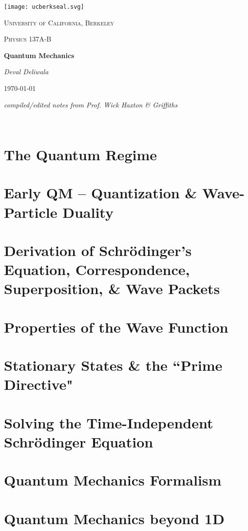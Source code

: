 \documentclass[10pt,letterpaper, twocolumn]{report}
\begin{document}
\begin{titlepage}
	\centering
	\texttt{[image: ucberkseal.svg]}\par\vspace{1cm}
	{\LARGE \textsc{University of California, Berkeley}\par}
	\vspace{1cm}
	{\Large \textsc{Physics 137A-B}\par}
	\vspace{1.5cm}
	{\huge\bfseries Quantum Mechanics \par}
	\vspace{2cm}
	{\Large\itshape Deval Deliwala\par}
	\vfill
	\vfill
	{\large \today\par}
  \vspace{5px}
  {\small \textit{compiled/edited notes from Prof. Wick Haxton \& Griffiths}}
\end{titlepage}

\newpage\
\newpage\
\tableofcontents
\newpage\

\chapter{The Quantum Regime}

\chapter{Early QM -- Quantization \& Wave-Particle Duality}

\chapter{Derivation of Schr\"odinger's Equation, Correspondence, Superposition,
\& Wave Packets}

\chapter{Properties of the Wave Function}

\chapter{Stationary States \& the ``Prime Directive"}

\chapter{Solving the Time-Independent Schr\"odinger Equation}

\chapter{Quantum Mechanics Formalism} 

\chapter{Quantum Mechanics beyond 1D}

\end{document}
